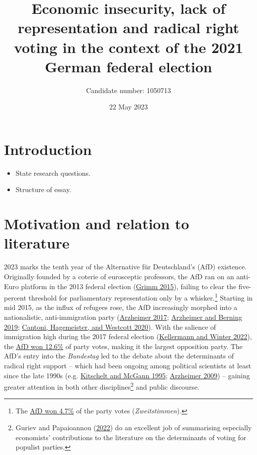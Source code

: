 \documentclass[
]{article}
\title{Economic insecurity, lack of representation and radical right
voting in the context of the 2021 German federal election}
\author{Candidate number: 1050713}
\date{22 May 2023}
\begin{document}
\maketitle

\hypertarget{introduction}{%
\section{Introduction}\label{introduction}}

\begin{itemize}
\item
  State research questions.
\item
  Structure of essay.
\end{itemize}

\hypertarget{motivation}{%
\section{Motivation and relation to literature}\label{motivation}}

2023 marks the tenth year of the Alternative für Deutschland's (AfD)
existence. Originally founded by a coterie of eurosceptic professors,
the AfD ran on an anti-Euro platform in the 2013 federal election
(\protect\hyperlink{ref-grimm_rise_2015}{Grimm 2015}), failing to clear
the five-percent threshold for parliamentary representation only by a
whisker.\footnote{The
  \href{https://www.bundeswahlleiterin.de/bundestagswahlen/2013/ergebnisse/bund-99.html}{AfD
  won 4.7\%} of the party votes (\emph{Zweitstimmen}).} Starting in mid
2015, as the influx of refugees rose, the AfD increasingly morphed into
a nationalistic, anti-immigration party
(\protect\hyperlink{ref-arzheimer_alternative_2017}{Arzheimer 2017};
\protect\hyperlink{ref-arzheimer_how_2019}{Arzheimer and Berning 2019};
\protect\hyperlink{ref-cantoni_persistence_2020}{Cantoni, Hagemeister,
and Westcott 2020}). With the salience of immigration high during the
2017 federal election
(\protect\hyperlink{ref-kellermann_immigration_2022}{Kellermann and
Winter 2022}), the
\href{https://www.bundeswahlleiterin.de/info/presse/mitteilungen/bundestagswahl-2017/34_17_endgueltiges_ergebnis.html}{AfD
won 12.6\%} of party votes, making it the largest opposition party. The
AfD's entry into the \emph{Bundestag} led to the debate about the
determinants of radical right support -- which had been ongoing among
political scientists at least since the late 1990s (e.g.
\protect\hyperlink{ref-kitschelt_radical_1995}{Kitschelt and McGann
1995}; \protect\hyperlink{ref-arzheimer_contextual_2009}{Arzheimer
2009}) -- gaining greater attention in both other disciplines\footnote{Guriev
  and Papaioannou (\protect\hyperlink{ref-guriev_political_2022}{2022})
  do an excellent job of summarising especially economists'
  contributions to the literature on the determinants of voting for
  populist parties.} and public discourse.
\end{document}
